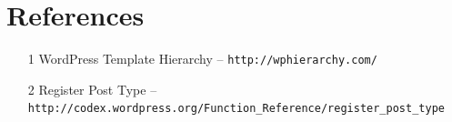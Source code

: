 \documentclass{article}
\begin{document}
\section*{References}

\begin{itemize}
    \item[1] WordPress Template Hierarchy -- {\tt http://wphierarchy.com/}
    \item[2] Register Post Type -- {\tt http://codex.wordpress.org/Function\_Reference/register\_post\_type}
\end{itemize}
\end{document}
